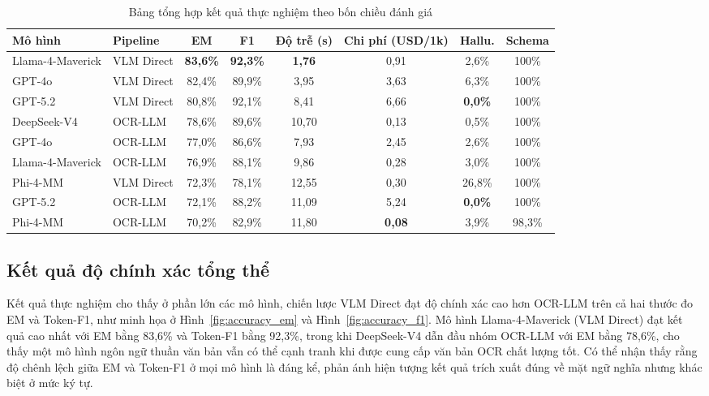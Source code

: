 ﻿\documentclass[12pt]{report}
\begin{document}
\begin{table}[h]
\centering
\caption{Bảng tổng hợp kết quả thực nghiệm theo bốn chiều đánh giá}
\label{tab:leaderboard}
\footnotesize
\renewcommand{\arraystretch}{1.3}
\begin{tabular}{|p{3cm}|p{1.7cm}|c|c|c|c|c|c|}
\hline
\textbf{Mô hình} & \textbf{Pipeline} & \textbf{EM} & \textbf{F1} & \textbf{Độ trễ (s)} & \textbf{Chi phí (USD/1k)} & \textbf{Hallu.} & \textbf{Schema} \\ \hline
Llama-4-Maverick & VLM Direct & \cellcolor{yellow!25}\textbf{83,6\%} & \cellcolor{yellow!25}\textbf{92,3\%} & \cellcolor{yellow!25}\textbf{1,76} & 0,91 & 2,6\% & 100\% \\ \hline
GPT-4o & VLM Direct & 82,4\% & 89,9\% & 3,95 & 3,63 & 6,3\% & 100\% \\ \hline
GPT-5.2 & VLM Direct & 80,8\% & 92,1\% & 8,41 & 6,66 & \cellcolor{yellow!25}\textbf{0,0\%} & 100\% \\ \hline
DeepSeek-V4 & OCR-LLM & 78,6\% & 89,6\% & 10,70 & 0,13 & 0,5\% & 100\% \\ \hline
GPT-4o & OCR-LLM & 77,0\% & 86,6\% & 7,93 & 2,45 & 2,6\% & 100\% \\ \hline
Llama-4-Maverick & OCR-LLM & 76,9\% & 88,1\% & 9,86 & 0,28 & 3,0\% & 100\% \\ \hline
Phi-4-MM & VLM Direct & 72,3\% & 78,1\% & 12,55 & 0,30 & 26,8\% & 100\% \\ \hline
GPT-5.2 & OCR-LLM & 72,1\% & 88,2\% & 11,09 & 5,24 & \cellcolor{yellow!25}\textbf{0,0\%} & 100\% \\ \hline
Phi-4-MM & OCR-LLM & 70,2\% & 82,9\% & 11,80 & \cellcolor{yellow!25}\textbf{0,08} & 3,9\% & 98,3\% \\ \hline
\end{tabular}
\end{table}

\subsection{Kết quả độ chính xác tổng thể}\label{sec:results_doctype}

Kết quả thực nghiệm cho thấy ở phần lớn các mô hình, chiến lược VLM Direct đạt độ chính xác cao hơn OCR-LLM trên cả hai thước đo EM và Token-F1, như minh họa ở Hình~\ref{fig:accuracy_em} và Hình~\ref{fig:accuracy_f1}. Mô hình Llama-4-Maverick (VLM Direct) đạt kết quả cao nhất với EM bằng 83,6\% và Token-F1 bằng 92,3\%, trong khi DeepSeek-V4 dẫn đầu nhóm OCR-LLM với EM bằng 78,6\%, cho thấy một mô hình ngôn ngữ thuần văn bản vẫn có thể cạnh tranh khi được cung cấp văn bản OCR chất lượng tốt. Có thể nhận thấy rằng độ chênh lệch giữa EM và Token-F1 ở mọi mô hình là đáng kể, phản ánh hiện tượng kết quả trích xuất đúng về mặt ngữ nghĩa nhưng khác biệt ở mức ký tự.
\end{document}

